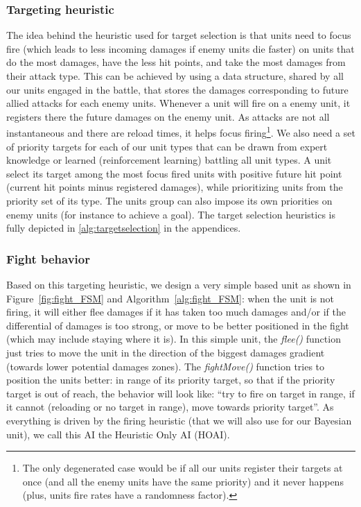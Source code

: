 \subsubsection{Targeting heuristic}
The idea behind the heuristic used for target selection is that units need to focus fire (which leads to less incoming damages if enemy units die faster) on units that do the most damages, have the less hit points, and take the most damages from their attack type. This can be achieved by using a data structure, shared by all our units engaged in the battle, that stores the damages corresponding to future allied attacks for each enemy units. Whenever a unit will fire on a enemy unit, it registers there the future damages on the enemy unit. As attacks are not all instantaneous and there are reload times, it helps focus firing\footnote{The only degenerated case would be if all our units register their targets at once (and all the enemy units have the same priority) and it never happens (plus, units fire rates have a randomness factor).}. 
We also need a set of priority targets for each of our unit types that can be drawn from expert knowledge or learned (reinforcement learning) battling all unit types. A unit select its target among the most focus fired units with positive future hit point (current hit points minus registered damages), while prioritizing units from the priority set of its type. The units group can also impose its own priorities on enemy units (for instance to achieve a goal). The target selection heuristics is fully depicted in \ref{alg:targetselection} in the appendices.

\subsubsection{Fight behavior}
\label{sec:HOAI}
Based on this targeting heuristic, we design a very simple  based unit as shown in Figure~\ref{fig:fight_FSM} and Algorithm~\ref{alg:fight_FSM}: when the unit is not firing, it will either flee damages if it has taken too much damages and/or if the differential of damages is too strong, or move to be better positioned in the fight (which may include staying where it is). In this simple unit, the \textit{flee()} function just tries to move the unit in the direction of the biggest damages gradient (towards lower potential damages zones). The \textit{fightMove()} function tries to position the units better: in range of its priority target, so that if the priority target is out of reach, the behavior will look like: ``try to fire on target in range, if it cannot (reloading or no target in range), move towards priority target''. As everything is driven by the firing heuristic (that we will also use for our Bayesian unit), we call this AI the Heuristic Only AI (HOAI).

